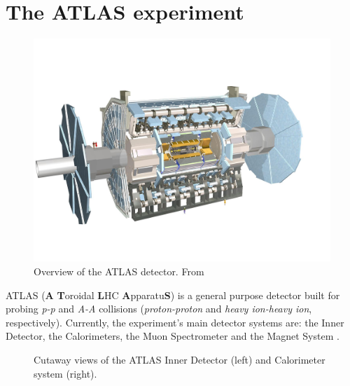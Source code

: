 
\section{The ATLAS experiment}%

\begin{figure}[h!tbpt]
    \centering
    \includegraphics[width=.7\textwidth]{Images/intro/ATLAS_detector.jpg}
    \captionsetup{width=\captionwidth}
    \caption{Overview of the ATLAS detector. From \cite{atlasDetectorTechnology}}
    \label{fig:ATLAS}
\end{figure}

ATLAS (\textbf{A} \textbf{T}oroidal \textbf{L}HC \textbf{A}pparatu\textbf{S}) is a general purpose detector built for probing \textit{p-p} and \textit{A-A} collisions (\textit{proton-proton} and \textit{heavy ion-heavy ion}, respectively). Currently, the experiment's main detector systems are: the Inner Detector, the Calorimeters, the Muon Spectrometer and the Magnet System \cite{Collaboration_The_ATLAS2008}. 

\begin{figure}[h!tbp]
    \centering
    \hfill
    \centering
    \caption{Cutaway views of the ATLAS Inner Detector (left) and Calorimeter system (right).}
\end{figure}


